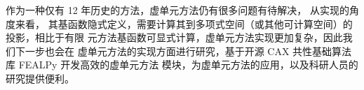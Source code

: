 作为一种仅有 12 年历史的方法，虚单元方法仍有很多问题有待解决，
从实现的角度来看，
其基函数隐式定义，需要计算其到多项式空间（或其他可计算空间）的投影，相比于有限
元方法基函数可显式计算，虚单元方法实现更加复杂，因此我们下一步也会在
虚单元方法的实现方面进行研究，基于开源 CAX 共性基础算法库 FEALPy 开发高效的虚单元方法
模块，为虚单元方法的应用，以及科研人员的研究提供便利。


%
%
%




